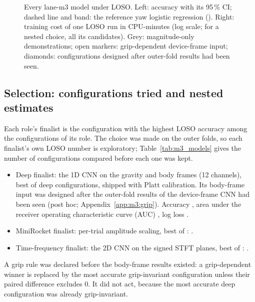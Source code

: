 \begin{figure}[tbp]
  \centering
  \caption{Every lane-m3 model under LOSO. Left: accuracy with its 95\,\% CI; dashed line and band: the reference yaw logistic regression (). Right: training cost of one LOSO run in CPU-minutes (log scale; for a nested choice, all its candidates). Grey: magnitude-only demonstrations; open markers: grip-dependent device-frame input; diamonds: configurations designed after outer-fold results had been seen.}
  \label{fig:M3_01_model_overview}\label{fig:app:m3-overview}
\end{figure}


\subsection{Selection: configurations tried and nested estimates}\label{app:m3:selection}

Each role's finalist is the configuration with the highest LOSO accuracy among the configurations of its role.
The choice was made on the outer folds, so each finalist's own LOSO number is exploratory; Table~\ref{tab:m3_models} gives the number of configurations compared before each one was kept.
\begin{itemize}
  \item Deep finalist: the 1D CNN on the gravity and body frames (12 channels), best of  deep configurations, shipped with Platt calibration. Its body-frame input was designed after the outer-fold results of the device-frame CNN had been seen (post hoc; Appendix~\ref{app:m3:grip}). Accuracy , area under the receiver operating characteristic curve (AUC) , log loss .
  \item MiniRocket finalist: per-trial amplitude scaling, best of : .
  \item Time-frequency finalist: the 2D CNN on the signed STFT planes, best of : .
\end{itemize}
A grip rule was declared before the body-frame results existed: a grip-dependent winner is replaced by the most accurate grip-invariant configuration unless their paired difference excludes 0.
It did not act, because the most accurate deep configuration was already grip-invariant.

